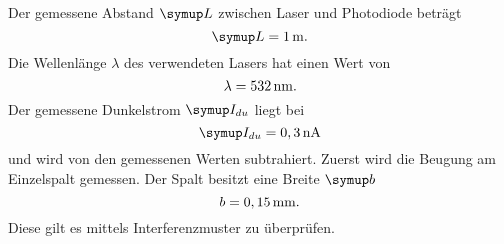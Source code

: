 Der gemessene Abstand $\su{L}$ zwischen Laser und Photodiode beträgt
\begin{equation*}
  \su{L} = 1\mt.
\end{equation*}
Die Wellenlänge $\lambda$ des verwendeten Lasers hat einen Wert von
\begin{equation*}
  \lambda = 532 \,\si{\nano\meter}.
\end{equation*}
Der gemessene Dunkelstrom $\su{I_{du}}$ liegt bei
\begin{equation*}
  \su{I_{du}} = 0,3\nA
\end{equation*}
und wird von den gemessenen Werten subtrahiert.
Zuerst wird die Beugung am Einzelspalt gemessen. Der Spalt besitzt eine Breite
$\su{b}$
\begin{equation*}
  b=0,15\,\si{\milli\meter}.
\end{equation*}
Diese gilt es mittels Interferenzmuster zu überprüfen.

